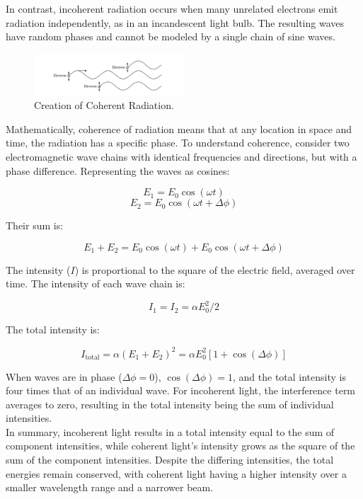 In contrast, incoherent radiation occurs when many unrelated electrons emit radiation independently, as in an incandescent light bulb. The resulting waves have random phases and cannot be modeled by a single chain of sine waves.

\begin{figure}[H]
	\centering
	\includegraphics[width=0.5\textwidth]{Images/coherent_radiation.png}
	\caption{Creation of Coherent Radiation.}
	\label{fig:coherent_radiation}
\end{figure}

Mathematically, coherence of radiation means that at any location in space and time, the radiation has a specific phase. To understand coherence, consider two electromagnetic wave chains with identical frequencies and directions, but with a phase difference. Representing the waves as cosines:

\[
E_1 = E_0 \cos(\omega t)
\]
\[
E_2 = E_0 \cos(\omega t + \Delta \phi)
\]

Their sum is:

\[
E_1 + E_2 = E_0 \cos(\omega t) + E_0 \cos(\omega t + \Delta \phi)
\]

The intensity (\( I \)) is proportional to the square of the electric field, averaged over time. The intensity of each wave chain is:

\[
I_1 = I_2 = \alpha E_0^2 / 2
\]

The total intensity is:

\[
I_{\text{total}} = \alpha (E_1 + E_2)^2 = \alpha E_0^2 \left[1 + \cos(\Delta \phi)\right]
\]

When waves are in phase (\( \Delta \phi = 0 \)), \( \cos(\Delta \phi) = 1 \), and the total intensity is four times that of an individual wave. For incoherent light, the interference term averages to zero, resulting in the total intensity being the sum of individual intensities. \\

In summary, incoherent light results in a total intensity equal to the sum of component intensities, while coherent light's intensity grows as the square of the sum of the component intensities. Despite the differing intensities, the total energies remain conserved, with coherent light having a higher intensity over a smaller wavelength range and a narrower beam.

